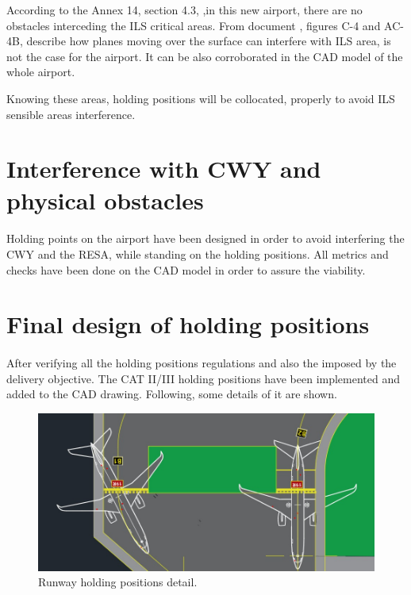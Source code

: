 	According to the Annex 14, section 4.3, \cite{Standards2016},in this new airport, there are no obstacles interceding the ILS critical areas. From document \cite{Telecomunicaciones}, figures C-4 and AC-4B, describe how planes moving over the surface can interfere with ILS area, is not the case for the airport. It can be also corroborated in the CAD model of the whole airport. 
	
	Knowing these areas, holding positions will be collocated, properly to avoid ILS sensible areas interference. 
	
	
	\section{Interference with CWY and physical obstacles}
	
	\paragraph{} Holding points on the airport have been designed in order to avoid interfering the CWY and the RESA, while standing on the holding positions. All metrics and checks have been done on the CAD model in order to assure the viability.
	
	\section{Final design of holding positions}
	
	\paragraph{} After verifying all the holding positions regulations and also the imposed by the delivery objective. The CAT II/III holding positions have been implemented and added to the CAD drawing. Following, some details of it are shown.
		
	\begin{figure}[H]
		\centering
		\includegraphics[clip, trim=0cm 0cm 0cm 0cm, width=\textwidth]{./images/holding/holdingRunway}
		\caption{Runway holding positions detail.}
		\label{holdingRunway}
	\end{figure}

